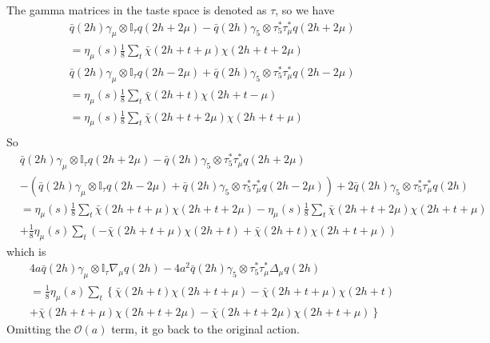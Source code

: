 The gamma matrices in the taste space is denoted as $\tau$, so we have
\begin{equation}
\begin{split}
&\bar{q}(2h)\gamma _{\mu}\otimes \mathbb{I}_{\tau} q(2h+2\mu) - \bar{q}(2h)\gamma _5\otimes \tau _5^*\tau _{\mu}^* q(2h+2\mu)\\
&=\eta _{\mu}(s)\frac{1}{8}\sum _{t} \bar{\chi}(2h+t+\mu)\chi (2h+t+2\mu)\\
&\bar{q}(2h)\gamma _{\mu}\otimes \mathbb{I}_{\tau} q(2h-2\mu) + \bar{q}(2h)\gamma _5\otimes \tau _5^*\tau _{\mu}^* q(2h-2\mu)\\
&=\eta _{\mu}(s)\frac{1}{8}\sum _{t} \bar{\chi}(2h+t)\chi (2h+t-\mu)\\
&=\eta _{\mu}(s)\frac{1}{8}\sum _{t} \bar{\chi}(2h+t+2\mu)\chi (2h+t+\mu)\\
\end{split}
\label{eq.staggeredquark2}
\end{equation}
So
\begin{equation}
\begin{split}
&\bar{q}(2h)\gamma _{\mu}\otimes \mathbb{I}_{\tau} q(2h+2\mu) - \bar{q}(2h)\gamma _5\otimes \tau _5^*\tau _{\mu}^* q(2h+2\mu)\\
&-\left(\bar{q}(2h)\gamma _{\mu}\otimes \mathbb{I}_{\tau} q(2h-2\mu) + \bar{q}(2h)\gamma _5\otimes \tau _5^*\tau _{\mu}^* q(2h-2\mu)\right)+2\bar{q}(2h)\gamma _5\otimes \tau _5^*\tau _{\mu}^* q(2h)\\
&=\eta _{\mu}(s)\frac{1}{8}\sum _{t} \bar{\chi}(2h+t+\mu)\chi (2h+t+2\mu)-\eta _{\mu}(s)\frac{1}{8}\sum _{t} \bar{\chi}(2h+t+2\mu)\chi (2h+t+\mu)\\
&+\frac{1}{8} \eta _{\mu}(s)\sum _{t} \left(-\bar{\chi}(2h+t+\mu)\chi (2h+t) +  \bar{\chi}(2h+t)\chi (2h+t+\mu)\right)
\end{split}
\label{eq.staggeredquark3}
\end{equation}
which is
\begin{equation}
\begin{split}
&4a\bar{q}(2h)\gamma _{\mu}\otimes \mathbb{I}_{\tau}\nabla _{\mu} q(2h) - 4a^2\bar{q}(2h)\gamma _5\otimes \tau _5^*\tau _{\mu}^* \Delta _{\mu}q(2h)\\
&=\frac{1}{8} \eta _{\mu}(s)\sum _{t} \left\{\bar{\chi}(2h+t)\chi (2h+t+\mu)-\bar{\chi}(2h+t+\mu)\chi (2h+t)\right.\\
&+\left.\bar{\chi}(2h+t+\mu)\chi (2h+t+2\mu)-\bar{\chi}(2h+t+2\mu)\chi (2h+t+\mu)\right\}
\end{split}
\label{eq.staggeredquark4}
\end{equation}
Omitting the $\mathcal{O}(a)$ term, it go back to the original action.

